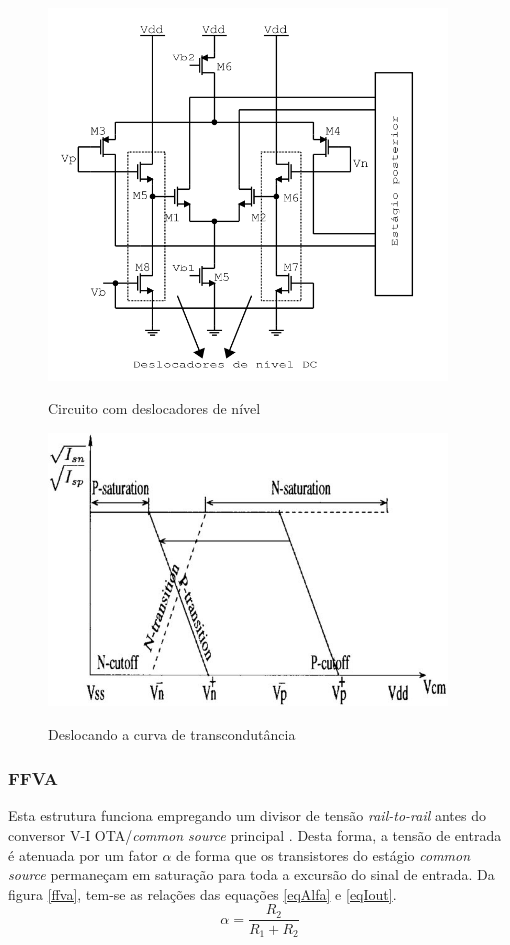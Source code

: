 \documentclass[
	12pt,				%
	oneside,			%
	a4paper,			%
	english,			%
	french,				%
	spanish,			%
	brazil				%
	]{abntex2}
\begin{document}
\begin{figure}[!ht]
  \centering
  \includegraphics[width=300pt]{deslocadores.PNG}\\
  \caption{Circuito com deslocadores de nível}\label{deslocadores}
\end{figure}

\begin{figure}[!ht]
  \centering
  \includegraphics[width=300pt]{overlap.jpg}\\
  \caption{Deslocando a curva de transcondutância}\label{overlap}
\end{figure}

\subsubsection{FFVA}
Esta estrutura funciona empregando um divisor de tensão \textit{rail-to-rail} antes do conversor V-I OTA/\textit{common source} principal \cite{azcona-calvo}. Desta forma, a tensão de entrada é atenuada por um fator $\alpha$ de forma que os transistores do estágio \textit{common source} permaneçam em saturação para toda a excursão do sinal de entrada. Da figura \ref{ffva}, tem-se as relações das equações \ref{eqAlfa} e \ref{eqIout}. 
\begin{equation}\label{eqAlfa}
\alpha = \frac{R_2}{R_1 + R_2}
\end{equation}
\end{document}
